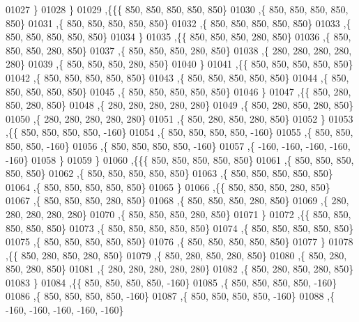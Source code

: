 \begin{DoxyCode}
01027    \}
01028   \}
01029  ,\{\{\{   850,   850,   850,   850,   850\}
01030    ,\{   850,   850,   850,   850,   850\}
01031    ,\{   850,   850,   850,   850,   850\}
01032    ,\{   850,   850,   850,   850,   850\}
01033    ,\{   850,   850,   850,   850,   850\}
01034    \}
01035   ,\{\{   850,   850,   850,   280,   850\}
01036    ,\{   850,   850,   850,   280,   850\}
01037    ,\{   850,   850,   850,   280,   850\}
01038    ,\{   280,   280,   280,   280,   280\}
01039    ,\{   850,   850,   850,   280,   850\}
01040    \}
01041   ,\{\{   850,   850,   850,   850,   850\}
01042    ,\{   850,   850,   850,   850,   850\}
01043    ,\{   850,   850,   850,   850,   850\}
01044    ,\{   850,   850,   850,   850,   850\}
01045    ,\{   850,   850,   850,   850,   850\}
01046    \}
01047   ,\{\{   850,   280,   850,   280,   850\}
01048    ,\{   280,   280,   280,   280,   280\}
01049    ,\{   850,   280,   850,   280,   850\}
01050    ,\{   280,   280,   280,   280,   280\}
01051    ,\{   850,   280,   850,   280,   850\}
01052    \}
01053   ,\{\{   850,   850,   850,   850,  -160\}
01054    ,\{   850,   850,   850,   850,  -160\}
01055    ,\{   850,   850,   850,   850,  -160\}
01056    ,\{   850,   850,   850,   850,  -160\}
01057    ,\{  -160,  -160,  -160,  -160,  -160\}
01058    \}
01059   \}
01060  ,\{\{\{   850,   850,   850,   850,   850\}
01061    ,\{   850,   850,   850,   850,   850\}
01062    ,\{   850,   850,   850,   850,   850\}
01063    ,\{   850,   850,   850,   850,   850\}
01064    ,\{   850,   850,   850,   850,   850\}
01065    \}
01066   ,\{\{   850,   850,   850,   280,   850\}
01067    ,\{   850,   850,   850,   280,   850\}
01068    ,\{   850,   850,   850,   280,   850\}
01069    ,\{   280,   280,   280,   280,   280\}
01070    ,\{   850,   850,   850,   280,   850\}
01071    \}
01072   ,\{\{   850,   850,   850,   850,   850\}
01073    ,\{   850,   850,   850,   850,   850\}
01074    ,\{   850,   850,   850,   850,   850\}
01075    ,\{   850,   850,   850,   850,   850\}
01076    ,\{   850,   850,   850,   850,   850\}
01077    \}
01078   ,\{\{   850,   280,   850,   280,   850\}
01079    ,\{   850,   280,   850,   280,   850\}
01080    ,\{   850,   280,   850,   280,   850\}
01081    ,\{   280,   280,   280,   280,   280\}
01082    ,\{   850,   280,   850,   280,   850\}
01083    \}
01084   ,\{\{   850,   850,   850,   850,  -160\}
01085    ,\{   850,   850,   850,   850,  -160\}
01086    ,\{   850,   850,   850,   850,  -160\}
01087    ,\{   850,   850,   850,   850,  -160\}
01088    ,\{  -160,  -160,  -160,  -160,  -160\}

\end{DoxyCode}

